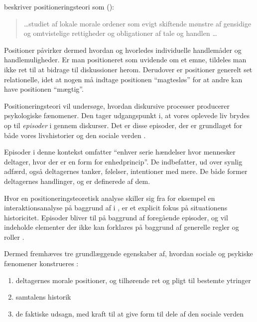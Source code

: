 \citeauthor{harrePositioningTheoryMoral1999} beskriver 
positioneringsteori som (\citeyear[s. 1, min oversættelse
]{harrePositioningTheoryMoral1999}):
\begin{quotation}
  \ldots studiet af lokale morale ordener som evigt skiftende 
  mønstre af gensidige og omtvistelige rettigheder og 
  obligationer af tale og handlen \ldots
\end{quotation}

Positioner påvirker dermed hvordan og hvorledes individuelle 
handlemåder og handlemuligheder. Er man positioneret som uvidende 
om et emne, tildeles man ikke ret til at bidrage til diskussioner 
herom. Derudover er positioner generelt set relationelle, idet at 
nogen må indtage positionen “magtesløs” for at andre kan have 
positionen “mægtig”.

Positioneringsteori vil undersøge, hvordan diskursive processer 
producerer psykologiske fænomener. Den tager udgangspunkt i, at 
vores oplevede liv brydes op til \emph{episoder} i gennem 
diskurser. Det er disse episoder, der er grundlaget for både vores
livshistorier og den sociale verden \autocite[s. 
4]{harrePositioningTheoryMoral1999}.

Episoder i denne kontekst omfatter “enhver serie hændelser hvor 
mennesker deltager, hvor der er en form for enhedprincip”. De 
indbefatter, ud over synlig adfærd, også deltagernes tanker, 
følelser, intentioner med mere. De både former deltagernes 
handlinger, og er definerede af dem.

Hvor en positioneringsteoretisk analyse skiller sig fra for 
eksempel en interaktionsanalyse på baggrund af 
\citeauthor{goffmanPresentationSelfEveryday1956} i
, er et explicit 
fokus på situationens historicitet. Episoder bliver til på 
baggrund af foregående episoder, og vil indeholde elementer der 
ikke kan forklares på baggrund af generelle regler og roller 
\autocite[s. 5-6]{harrePositioningTheoryMoral1999}.

Dermed fremhæves tre grundlæggende egenskaber af, hvordan sociale 
og psykiske fænomener konstrueres 
\autocite{harrePositioningTheoryMoral1999}:
\begin{enumerate}
  \item
    deltagernes morale positioner, og tilhørende ret og pligt 
    til bestemte ytringer
  \item
    samtalens historik
  \item
    de faktiske udsagn, med kraft til at give form til dele af 
    den sociale verden
\end{enumerate}

